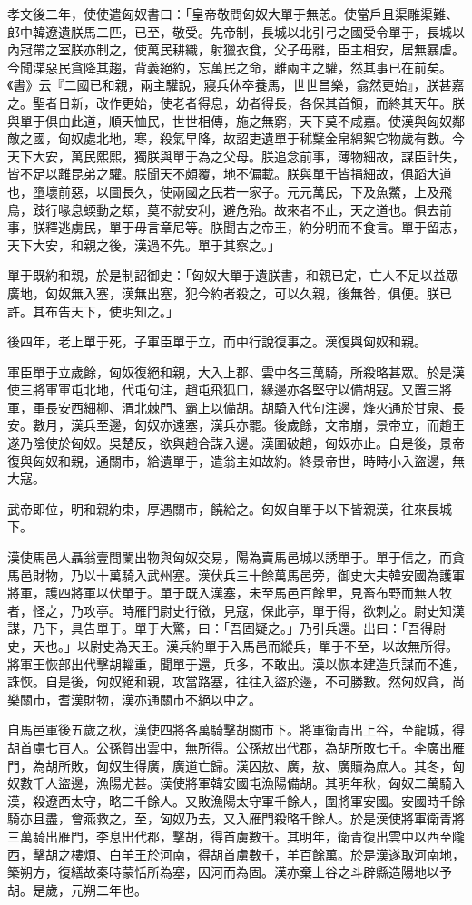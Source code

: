 \begin{pinyinscope}
孝文後二年，使使遣匈奴書曰：「皇帝敬問匈奴大單于無恙。使當戶且渠雕渠難、郎中韓遼遺朕馬二匹，已至，敬受。先帝制，長城以北引弓之國受令單于，長城以內冠帶之室朕亦制之，使萬民耕織，射獵衣食，父子毋離，臣主相安，居無暴虐。今聞渫惡民貪降其趨，背義絕約，忘萬民之命，離兩主之驩，然其事已在前矣。《書》云『二國已和親，兩主驩說，寢兵休卒養馬，世世昌樂，翕然更始』，朕甚嘉之。聖者日新，改作更始，使老者得息，幼者得長，各保其首領，而終其天年。朕與單于俱由此道，順天恤民，世世相傳，施之無窮，天下莫不咸嘉。使漢與匈奴鄰敵之國，匈奴處北地，寒，殺氣早降，故詔吏遺單于秫糱金帛綿絮它物歲有數。今天下大安，萬民熙熙，獨朕與單于為之父母。朕追念前事，薄物細故，謀臣計失，皆不足以離昆弟之驩。朕聞天不頗覆，地不偏載。朕與單于皆捐細故，俱蹈大道也，墮壞前惡，以圖長久，使兩國之民若一家子。元元萬民，下及魚鱉，上及飛鳥，跂行喙息蝡動之類，莫不就安利，避危殆。故來者不止，天之道也。俱去前事，朕釋逃虜民，單于毋言章尼等。朕聞古之帝王，約分明而不食言。單于留志，天下大安，和親之後，漢過不先。單于其察之。」

單于既約和親，於是制詔御史：「匈奴大單于遺朕書，和親已定，亡人不足以益眾廣地，匈奴無入塞，漢無出塞，犯今約者殺之，可以久親，後無咎，俱便。朕已許。其布告天下，使明知之。」

後四年，老上單于死，子軍臣單于立，而中行說復事之。漢復與匈奴和親。

軍臣單于立歲餘，匈奴復絕和親，大入上郡、雲中各三萬騎，所殺略甚眾。於是漢使三將軍軍屯北地，代屯句注，趙屯飛狐口，緣邊亦各堅守以備胡寇。又置三將軍，軍長安西細柳、渭北棘門、霸上以備胡。胡騎入代句注邊，烽火通於甘泉、長安。數月，漢兵至邊，匈奴亦遠塞，漢兵亦罷。後歲餘，文帝崩，景帝立，而趙王遂乃陰使於匈奴。吳楚反，欲與趙合謀入邊。漢圍破趙，匈奴亦止。自是後，景帝復與匈奴和親，通關市，給遺單于，遣翁主如故約。終景帝世，時時小入盜邊，無大寇。

武帝即位，明和親約束，厚遇關市，饒給之。匈奴自單于以下皆親漢，往來長城下。

漢使馬邑人聶翁壹間闌出物與匈奴交易，陽為賣馬邑城以誘單于。單于信之，而貪馬邑財物，乃以十萬騎入武州塞。漢伏兵三十餘萬馬邑旁，御史大夫韓安國為護軍將軍，護四將軍以伏單于。單于既入漢塞，未至馬邑百餘里，見畜布野而無人牧者，怪之，乃攻亭。時雁門尉史行徼，見寇，保此亭，單于得，欲刺之。尉史知漢謀，乃下，具告單于。單于大驚，曰：「吾固疑之。」乃引兵還。出曰：「吾得尉史，天也。」以尉史為天王。漢兵約單于入馬邑而縱兵，單于不至，以故無所得。將軍王恢部出代擊胡輜重，聞單于還，兵多，不敢出。漢以恢本建造兵謀而不進，誅恢。自是後，匈奴絕和親，攻當路塞，往往入盜於邊，不可勝數。然匈奴貪，尚樂關市，耆漢財物，漢亦通關市不絕以中之。

自馬邑軍後五歲之秋，漢使四將各萬騎擊胡關市下。將軍衛青出上谷，至龍城，得胡首虜七百人。公孫賀出雲中，無所得。公孫敖出代郡，為胡所敗七千。李廣出雁門，為胡所敗，匈奴生得廣，廣道亡歸。漢囚敖、廣，敖、廣贖為庶人。其冬，匈奴數千人盜邊，漁陽尤甚。漢使將軍韓安國屯漁陽備胡。其明年秋，匈奴二萬騎入漢，殺遼西太守，略二千餘人。又敗漁陽太守軍千餘人，圍將軍安國。安國時千餘騎亦且盡，會燕救之，至，匈奴乃去，又入雁門殺略千餘人。於是漢使將軍衛青將三萬騎出雁門，李息出代郡，擊胡，得首虜數千。其明年，衛青復出雲中以西至隴西，擊胡之樓煩、白羊王於河南，得胡首虜數千，羊百餘萬。於是漢遂取河南地，築朔方，復繕故秦時蒙恬所為塞，因河而為固。漢亦棄上谷之斗辟縣造陽地以予胡。是歲，元朔二年也。


\end{pinyinscope}
